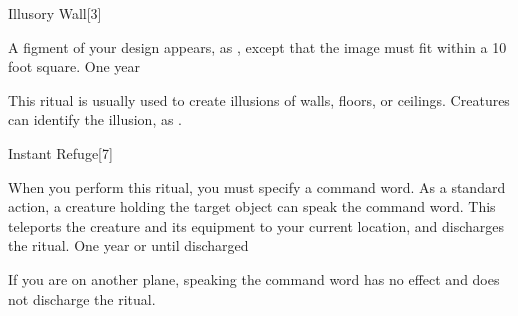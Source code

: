 \begin{spellsection}{Illusory Wall}[3]
    \begin{spellheader}
    \end{spellheader}
    \begin{spellcontent}
        \begin{spelltargetinginfo}
            \spellrng{\rngclose}
        \end{spelltargetinginfo}
        \begin{spelleffects}

            \spellline
            \spelleffect A figment of your design appears, as , except that the image must fit within a 10 foot square.
            \spelldur One year
        \end{spelleffects}
    \end{spellcontent}
    \begin{spellfooter}
        \spellnotes This ritual is usually used to create illusions of walls, floors, or ceilings. Creatures can identify the illusion, as .
    \end{spellfooter}
\end{spellsection}

\begin{spellsection}{Instant Refuge}[7]
    \begin{spellheader}
    \end{spellheader}
    \begin{spellcontent}
        \begin{spelltargetinginfo}
        \end{spelltargetinginfo}
        \begin{spelleffects}

            \spellspecial When you perform this ritual, you must specify a command word.
            \spelleffect As a standard action, a creature holding the target object can speak the command word. This teleports the creature and its equipment to your current location, and discharges the ritual.
            \spelldur One year or until discharged
        \end{spelleffects}
    \end{spellcontent}
    \begin{spellfooter}
        \spellnotes If you are on another plane, speaking the command word has no effect and does not discharge the ritual.
    \end{spellfooter}
\end{spellsection}

